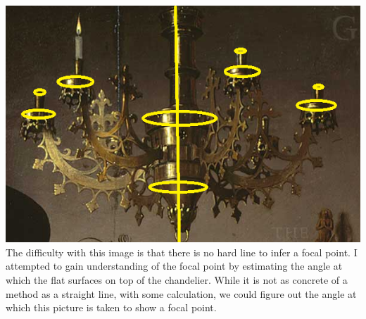 \documentclass[a4paper,12pt]{article}
\begin{document}
\includegraphics[scale=.5]{chandelier.png}\\
The difficulty with this image is that there is no hard line to infer a focal point.  I attempted to gain understanding of the focal point by estimating the angle at which the flat surfaces on top of the chandelier.  While it is not as concrete of a method as a straight line, with some calculation, we could figure out the angle at which this picture is taken to show a focal point.  
\end{document}
